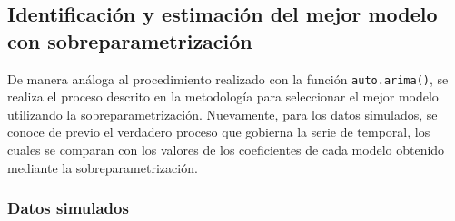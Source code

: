 \documentclass[
]{article}
\begin{document}
\begin{table}[!h]

\caption{\label{tab:unnamed-chunk-26}\label{tab:coeficientes_reales_autoarima}Coefcientes de los modelos ajustados con a las series reales con auto.arima()}
\centering
{}
\end{table}

\subsection{Identificación y estimación del mejor modelo con sobreparametrización}

De manera análoga al procedimiento realizado con la función
\texttt{auto.arima()}, se realiza el proceso descrito en la metodología
para seleccionar el mejor modelo utilizando la sobreparametrización.
Nuevamente, para los datos simulados, se conoce de previo el verdadero
proceso que gobierna la serie de temporal, los cuales se comparan con
los valores de los coeficientes de cada modelo obtenido mediante la
sobreparametrización.

\subsubsection{Datos simulados}
\end{document}
